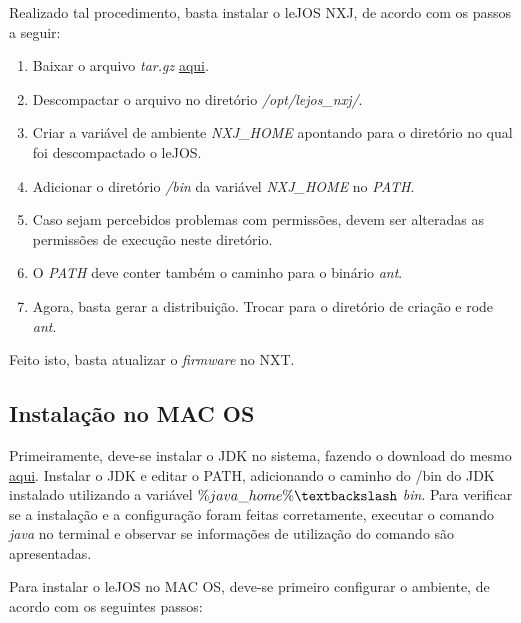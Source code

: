 	Realizado tal procedimento, basta instalar o leJOS NXJ, de acordo com os passos a seguir:

	\begin{enumerate}
		\item Baixar o arquivo \textit{tar.gz} \href{www.lejos.org}{aqui}.
		\item Descompactar o arquivo no diretório \textit{/opt/lejos\_nxj/}.
		\item Criar a variável de ambiente \textit{NXJ\_HOME} apontando para o diretório no qual foi descompactado o leJOS.
		\item Adicionar o diretório \textit{/bin} da variável \textit{NXJ\_HOME} no \textit{PATH}.
		\item Caso sejam percebidos problemas com permissões, devem ser alteradas as permissões de execução neste diretório.
		\item O \textit{PATH} deve conter também o caminho para o binário \textit{ant}.
		\item Agora, basta gerar a distribuição. Trocar para o diretório de criação e rode \textit{ant}.
	\end{enumerate}

	Feito isto, basta atualizar o \textit{firmware} no NXT.

\subsection{Instalação no MAC OS} %
\label{sub:instalação_no_mac_os}

	Primeiramente, deve-se instalar o JDK no sistema, fazendo o download do mesmo \href{http://www.oracle.com/technetwork/java/}{aqui}.
	Instalar o JDK e editar o PATH, adicionando o caminho do /bin do JDK instalado utilizando a variável \textit{$\%java\_home\% \textbackslash$ bin}.
	Para verificar se a instalação e a configuração foram feitas corretamente, executar o comando \textit{java} no terminal e observar
	se informações de utilização do comando são apresentadas.

	Para instalar o leJOS no MAC OS, deve-se primeiro configurar o ambiente, de acordo com os seguintes passos:

